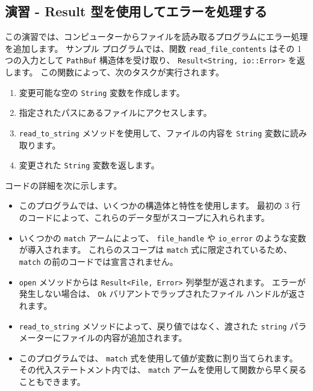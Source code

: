 \subsection{演習 - Result 型を使用してエラーを処理する}

この演習では、コンピューターからファイルを読み取るプログラムにエラー処理を追加します。 サンプル プログラムでは、関数 \texttt{read\_file\_contents} はその 1 つの入力として \texttt{PathBuf} 構造体を受け取り、 \texttt{Result<String, io::Error>} を返します。 この関数によって、次のタスクが実行されます。

\begin{enumerate}

\item 変更可能な空の \texttt{String} 変数を作成します。
\item 指定されたパスにあるファイルにアクセスします。
\item \texttt{read\_to\_string} メソッドを使用して、ファイルの内容を \texttt{String} 変数に読み取ります。
\item 変更された \texttt{String} 変数を返します。

\end{enumerate}

コードの詳細を次に示します。

\begin{itemize}

\item このプログラムでは、いくつかの構造体と特性を使用します。 最初の 3 行のコードによって、これらのデータ型がスコープに入れられます。
\item いくつかの \texttt{match} アームによって、 \texttt{file\_handle} や \texttt{io\_error} のような変数が導入されます。 これらのスコープは \texttt{match} 式に限定されているため、 \texttt{match} の前のコードでは宣言されません。
\item \texttt{open} メソッドからは \texttt{Result<File, Error>} 列挙型が返されます。 エラーが発生しない場合は、 \texttt{Ok} バリアントでラップされたファイル ハンドルが返されます。
\item \texttt{read\_to\_string} メソッドによって、戻り値ではなく、渡された \texttt{string} パラメーターにファイルの内容が追加されます。
\item このプログラムでは、 \texttt{match} 式を使用して値が変数に割り当てられます。 その代入ステートメント内では、 \texttt{match} アームを使用して関数から早く戻ることもできます。

\end{itemize}

